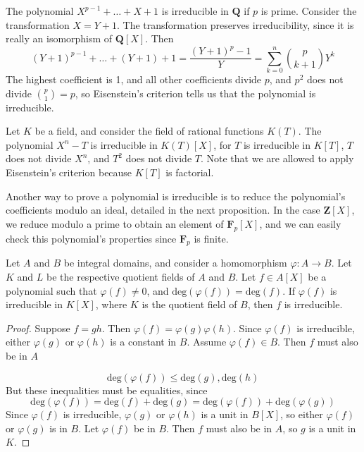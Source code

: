 \begin{example}
    The polynomial $X^{p-1} + \dots + X + 1$ is irreducible in $\mathbf{Q}$ if $p$ is prime. Consider the transformation $X = Y + 1$. The transformation preserves irreducibility, since it is really an isomorphism of $\mathbf{Q}[X]$. Then
    \[ (Y + 1)^{p-1} + \dots + (Y + 1) + 1 = \frac{(Y + 1)^p - 1}{Y} = \sum_{k = 0}^n \binom{p}{k+1} Y^k \]
    The highest coefficient is 1, and all other coefficients divide $p$, and $p^2$ does not divide $\binom{p}{1} = p$, so Eisenstein's criterion tells us that the polynomial is irreducible.
\end{example}

\begin{example}
    Let $K$ be a field, and consider the field of rational functions $K(T)$. The polynomial $X^n - T$ is irreducible in $K(T)[X]$, for $T$ is irreducible in $K[T]$, $T$ does not divide $X^n$, and $T^2$ does not divide $T$. Note that we are allowed to apply Eisenstein's criterion because $K[T]$ is factorial.
\end{example}

Another way to prove a polynomial is irreducible is to reduce the polynomial's coefficients modulo an ideal, detailed in the next proposition. In the case $\mathbf{Z}[X]$, we reduce modulo a prime to obtain an element of $\mathbf{F}_p[X]$, and we can easily check this polynomial's properties since $\mathbf{F}_p$ is finite.

\begin{theorem}
    Let $A$ and $B$ be integral domains, and consider a homomorphism $\varphi:A \to B$. Let $K$ and $L$ be the respective quotient fields of $A$ and $B$. Let $f \in A[X]$ be a polynomial such that $\varphi(f) \neq 0$, and $\text{deg}(\varphi(f)) = \text{deg}(f)$. If $\varphi(f)$ is irreducible in $K[X]$, where $K$ is the quotient field of $B$, then $f$ is irreducible.
\end{theorem}
\begin{proof}
    Suppose $f = gh$. Then $\varphi(f) = \varphi(g) \varphi(h)$. Since $\varphi(f)$ is irreducible, either $\varphi(g)$ or $\varphi(h)$ is a constant in $B$. Assume $\varphi(f) \in B$. Then $f$ must also be in $A$

    \[ \text{deg}(\varphi(f)) \leq \text{deg}(g), \text{deg}(h) \]
    But these inequalities must be equalities, since
    \[ \text{deg}(\varphi(f)) = \text{deg}(f) + \text{deg}(g) = \text{deg}(\varphi(f)) + \text{deg}(\varphi(g)) \]
    Since $\varphi(f)$ is irreducible, $\varphi(g)$ or $\varphi(h)$ is a unit in $B[X]$, so either $\varphi(f)$ or $\varphi(g)$ is in $B$. Let $\varphi(f)$ be in $B$. Then $f$ must also be in $A$, so $g$ is a unit in $K$.
\end{proof}

